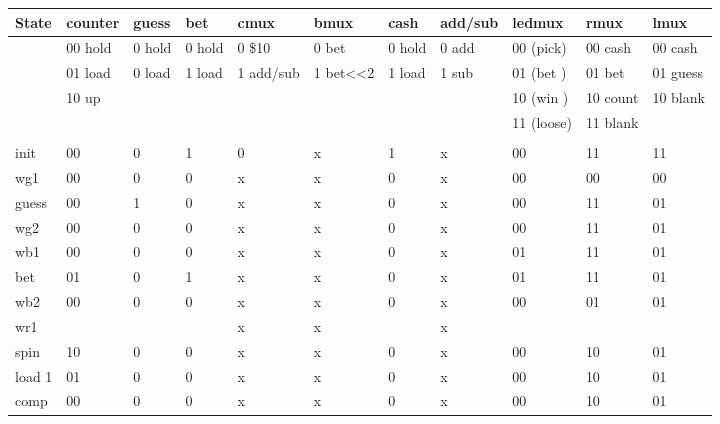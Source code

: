 \begin{enumerate}
\begin{onlysolution}
{{\tiny
\begin{tabular}{l|l|l|l|l|l|l|l|l|l|l}
State &  counter& guess  & bet    & cmux      & bmux     & cash   & add/sub & ledmux    & rmux   & lmux \\ \hline
      & 00 hold & 0 hold & 0 hold & 0 \$10    & 0 bet    & 0 hold & 0 add  & 00 (pick) &00 cash &00 cash  \\ \hline
      & 01 load & 0 load & 1 load & 1 add/sub & 1 bet<<2 & 1 load & 1 sub  & 01 (bet ) &01 bet  &01 guess \\ \hline
      & 10 up   &        &        &  	      &          &        &        & 10 (win ) &10 count&10 blank \\ \hline
      &         &        &        &  	      &          &        &        & 11 (loose)&11 blank&         \\ \hline
      &         &        &        &  	      &          &        &        &          &         &   \\ \hline
init  & 00      & 0      &  1     & 0	      & x        &  1     &  x     & 00       &  11     & 11\\ \hline
wg1   & 00      & 0      &  0     & x	      & x        &  0     &  x     & 00       &  00     & 00\\ \hline
guess & 00      & 1      &  0     & x	      & x        &  0     &  x     & 00       &  11     & 01\\ \hline
wg2   & 00      & 0      &  0     & x	      & x        &  0     &  x     & 00       &  11     & 01\\ \hline
wb1   & 00      & 0      &  0     & x	      & x        &  0     &  x     & 01       &  11     & 01\\ \hline
bet   & 01      & 0      &  1     & x	      & x        &  0     &  x     & 01       &  11     & 01\\ \hline
wb2   & 00      & 0      &  0     & x	      & x        &  0     &  x     & 00       &  01     & 01\\ \hline
wr1   &         &        &        & x	      & x        &        &  x     &          &         &   \\ \hline
spin  & 10      & 0      &  0     & x	      & x        &  0     &  x     & 00       &  10     & 01\\ \hline
load 1& 01      & 0      &  0     & x	      & x        &  0     &  x     & 00       &  10     & 01\\ \hline
comp  & 00      & 0      &  0     & x	      & x        &  0     &  x     & 00       &  10     & 01\\ \hline

\end{tabular}}}
\end{onlysolution}
\end{enumerate}
